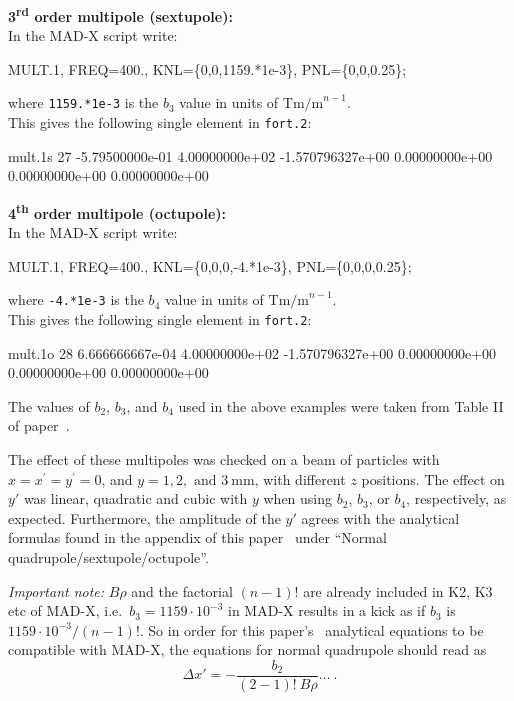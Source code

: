 \noindent\textbf{3\textsuperscript{rd} order multipole (sextupole):}\\
\noindent In the MAD-X script write:
\begin{ctverbatim}
MULT.1, FREQ=400., KNL=\{0,0,1159.*1e-3\}, PNL=\{0,0,0.25\};
\end{ctverbatim}
where \texttt{1159.*1e-3} is the $b_3$ value in units of $\mathrm{Tm/m}^{n-1}$.\\
This gives the following single element in \texttt{fort.2}:
\begin{ctverbatim}
mult.1s  27 -5.79500000e-01  4.00000000e+02  -1.570796327e+00  0.00000000e+00  0.00000000e+00  0.00000000e+00
\end{ctverbatim}

\noindent\textbf{4\textsuperscript{th} order multipole (octupole):}\\
\noindent In  the MAD-X script write:
\begin{ctverbatim}
MULT.1, FREQ=400., KNL=\{0,0,0,-4.*1e-3\}, PNL=\{0,0,0,0.25\};
\end{ctverbatim}
where \texttt{-4.*1e-3} is the $b_4$ value in units of $\mathrm{Tm/m}^{n-1}$.\\
This gives the following single element in \texttt{fort.2}:
\begin{ctverbatim}
mult.1o  28  6.666666667e-04  4.00000000e+02  -1.570796327e+00  0.00000000e+00  0.00000000e+00  0.00000000e+00
\end{ctverbatim}

\bigskip
\noindent The values of $b_2$, $b_3$, and $b_4$ used in the above examples were taken from Table II of paper~\cite{RFmultsPaper}.

The effect of these multipoles was checked on a beam of particles with $x=x^{\prime}=y^{\prime}=0$, and $y= 1, 2, \text{ and } 3~\mathrm{mm}$, with different $z$ positions.
The effect on $y'$ was linear, quadratic and cubic with $y$ when using $b_2$, $b_3$, or $b_4$, respectively, as expected.
Furthermore, the amplitude of the $y'$ agrees with the analytical formulas found in the appendix of this paper~\cite{RFmultsPaper} under ``Normal quadrupole/sextupole/octupole''.

\textit{Important note:} $B\rho$ and the factorial $(n-1)!$ are already included in K2, K3 etc of MAD-X, i.e.\ $b_3=1159\cdot10^{-3}$ in MAD-X results in a kick as if $b_3$ is $1159\cdot10^{-3}/(n-1)!$.
So in order for this paper's~\cite{RFmultsPaper} analytical equations to be compatible with MAD-X, the equations for normal quadrupole should read as
\begin{equation*}
    \Delta x'=-\frac{b_2}{(2-1)! ~ B\rho} \ldots~.
\end{equation*}

